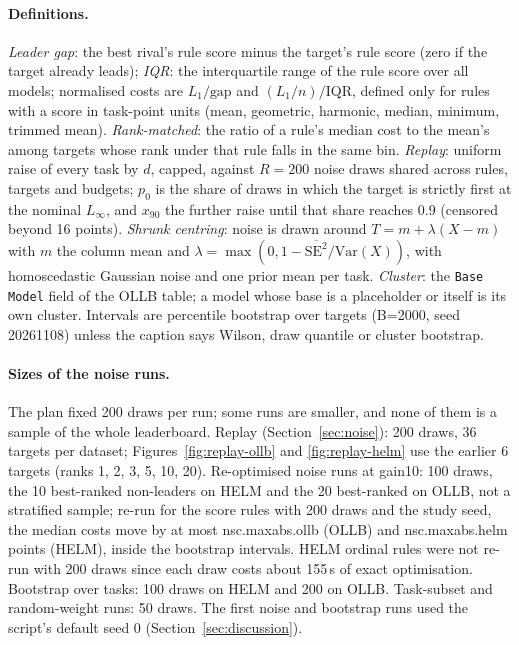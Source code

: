 \paragraph{Definitions.} \emph{Leader gap}: the best rival's rule score minus the target's rule score (zero if the target already leads); \emph{IQR}: the interquartile range of the rule score over all models; normalised costs are $L_1/\text{gap}$ and $(L_1/n)/\text{IQR}$, defined only for rules with a score in task-point units (mean, geometric, harmonic, median, minimum, trimmed mean). \emph{Rank-matched}: the ratio of a rule's median cost to the mean's among targets whose rank under that rule falls in the same bin. \emph{Replay}: uniform raise of every task by $d$, capped, against $R=200$ noise draws shared across rules, targets and budgets; $p_0$ is the share of draws in which the target is strictly first at the nominal $L_\infty$, and $x_{90}$ the further raise until that share reaches 0.9 (censored beyond 16 points). \emph{Shrunk centring}: noise is drawn around $T=m+\lambda(X-m)$ with $m$ the column mean and $\lambda=\max(0,1-\overline{\mathrm{SE}^2}/\mathrm{Var}(X))$, with homoscedastic Gaussian noise and one prior mean per task. \emph{Cluster}: the \texttt{Base Model} field of the OLLB table; a model whose base is a placeholder or itself is its own cluster. Intervals are percentile bootstrap over targets (B=2000, seed 20261108) unless the caption says Wilson, draw quantile or cluster bootstrap.

\paragraph{Sizes of the noise runs.} The plan fixed 200 draws per run; some runs are smaller, and none of them is a sample of the whole leaderboard. Replay (Section~\ref{sec:noise}): 200 draws, 36 targets per dataset; Figures~\ref{fig:replay-ollb} and \ref{fig:replay-helm} use the earlier 6 targets (ranks 1, 2, 3, 5, 10, 20). Re-optimised noise runs at \textsf{gain10}: 100 draws, the 10 best-ranked non-leaders on HELM and the 20 best-ranked on OLLB, not a stratified sample; re-run for the score rules with 200 draws and the study seed, the median costs move by at most \num{nsc.maxabs.ollb} (OLLB) and \num{nsc.maxabs.helm} points (HELM), inside the bootstrap intervals. HELM ordinal rules were not re-run with 200 draws since each draw costs about 155\,s of exact optimisation. Bootstrap over tasks: 100 draws on HELM and 200 on OLLB. Task-subset and random-weight runs: 50 draws. The first noise and bootstrap runs used the script's default seed 0 (Section~\ref{sec:discussion}).

